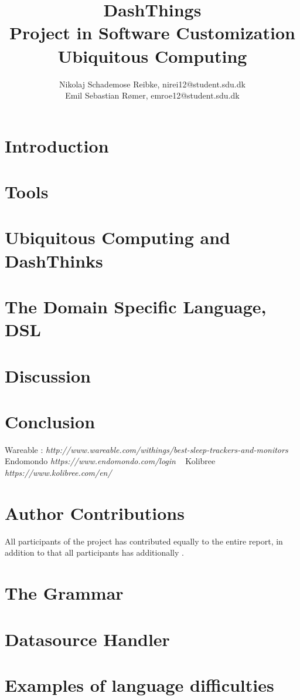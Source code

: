 \documentclass[12pt,a4paper]{article}
\begin{document}
\linespread{1.25}
\title{\textbf{DashThings \\ Project in Software Customization Ubiquitous Computing}}

\author{Nikolaj Schademose Reibke, nirei12@student.sdu.dk\\Emil Sebastian R{\o}mer, emroe12@student.sdu.dk}

\maketitle

\section{Introduction}


\section{Tools}


\section{Ubiquitous Computing and DashThinks}


\section{The Domain Specific Language, DSL}


\section{Discussion}


\section{Conclusion}



\begin{thebibliography}{1}
 Wareable : \textit{http://www.wareable.com/withings/best-sleep-trackers-and-monitors} 
 Endomondo \textit{https://www.endomondo.com/login}
\
 Kolibree \textit{https://www.kolibree.com/en/}
\end{thebibliography}

\appendix
\section{Author Contributions}
All participants of the project has contributed equally to the entire report,
in addition to that all participants has additionally .

\section{The Grammar}


\section{Datasource Handler}


\section{Examples of language difficulties}

\end{document}
